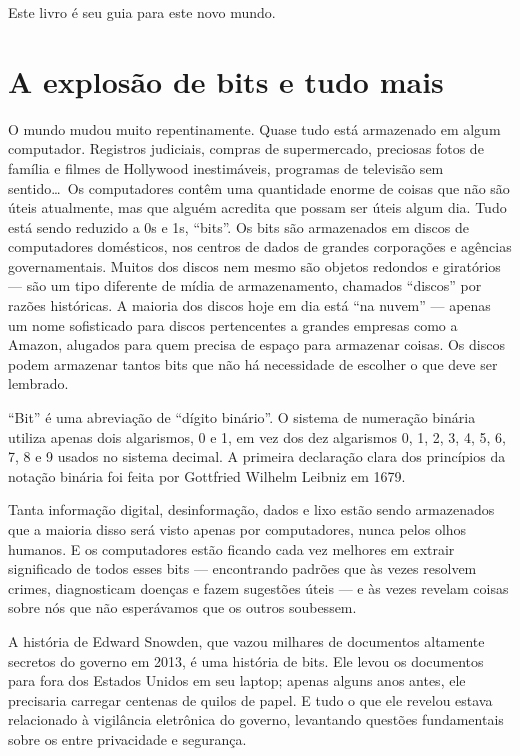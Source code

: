 Este livro é seu guia para este novo mundo.


\section{A explosão de bits e tudo mais}
\label{cap1:exp-dig-bits}

O mundo mudou muito repentinamente. Quase tudo está armazenado em algum 
computador. Registros judiciais, compras de supermercado, preciosas fotos de 
família e filmes de Hollywood inestimáveis, programas de televisão sem 
sentido\ldots\ Os computadores contêm uma quantidade enorme de coisas que não 
são úteis atualmente, mas que alguém acredita que possam ser úteis algum dia. 
Tudo está sendo reduzido a 0s e 1s, ``bits''. Os bits são armazenados em discos
de computadores domésticos, nos centros de dados de grandes corporações e 
agências governamentais. Muitos dos discos nem mesmo são objetos redondos e 
giratórios --- são um tipo diferente de mídia de armazenamento, chamados 
``discos'' por razões históricas. A maioria dos discos hoje em dia está ``na
nuvem'' --- apenas um nome sofisticado para discos pertencentes a grandes 
empresas como a Amazon, alugados para quem precisa de espaço para armazenar 
coisas. Os discos podem armazenar tantos bits que não há necessidade de escolher 
o que deve ser lembrado.

\begin{tcolorbox}
``Bit'' é uma abreviação de ``dígito binário''. O sistema de numeração binária
utiliza apenas dois algarismos, 0 e 1, em vez dos dez algarismos 0, 1, 2, 3, 4,
5, 6, 7, 8 e 9 usados no sistema decimal. A primeira declaração clara dos
princípios da notação binária foi feita por Gottfried Wilhelm Leibniz em 1679.
\end{tcolorbox}

Tanta informação digital, desinformação, dados e lixo estão sendo armazenados 
que a maioria disso será visto apenas por computadores, nunca pelos olhos 
humanos. E os computadores estão ficando cada vez melhores em extrair 
significado de todos esses bits --- encontrando padrões que às vezes resolvem
crimes, diagnosticam doenças e fazem sugestões úteis --- e às vezes revelam
coisas sobre nós que não esperávamos que os outros soubessem.

A história de Edward Snowden, que vazou milhares de documentos altamente
secretos do governo em 2013, é uma história de bits. Ele levou os documentos 
para fora dos Estados Unidos em seu laptop; apenas alguns anos antes, ele
precisaria carregar centenas de quilos de papel. E tudo o que ele revelou estava
relacionado à vigilância eletrônica do governo, levantando questões fundamentais
sobre os  entre privacidade e segurança.

